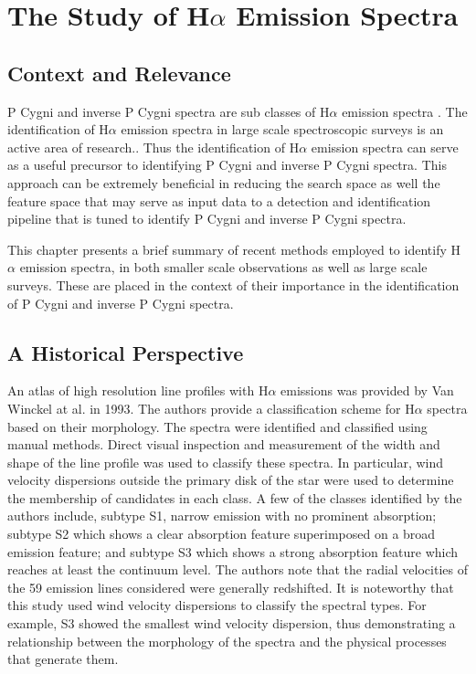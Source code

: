 \chapter{The Study of H$\alpha$ Emission Spectra}

\section{Context and Relevance}
P Cygni and inverse P Cygni spectra are sub classes of H$\alpha$ emission spectra \cite{zhang2021catalog}. The identification of H$\alpha$ emission spectra in large scale spectroscopic surveys is an active area of research.\cite{zhang2021catalog,vcotar2021galah,traven2015gaia}. Thus the identification of H$\alpha$ emission spectra can serve as a useful precursor to identifying P Cygni and inverse P Cygni spectra. This approach can be extremely beneficial in reducing the search space as well the feature space that may serve as input data to a detection and identification pipeline that is tuned to identify P Cygni and inverse P Cygni spectra. 

This chapter presents a brief summary of recent methods employed to identify H$\alpha$ emission spectra, in both smaller scale observations as well as large scale surveys. These are placed in the context of their importance in the identification of P Cygni and inverse P Cygni spectra.

\section{A Historical Perspective}
An atlas of high resolution line profiles with H$\alpha$ emissions was provided by Van Winckel at al. in 1993\cite{van1993atlas}. The authors provide a classification scheme for H$\alpha$ spectra based on their morphology. The spectra were identified and classified using manual methods. Direct visual inspection and measurement of the width and shape of the line profile was used to classify these spectra. In particular, wind velocity dispersions outside the primary disk of the star were used to determine the membership of candidates in each class.
A few of the classes identified by the authors include, subtype S1, narrow emission with no prominent absorption; subtype S2 which shows a clear absorption feature superimposed on a broad emission feature; and subtype S3 which shows a strong absorption feature which reaches at least the continuum level. The authors note that the radial velocities of the 59 emission lines considered were generally redshifted. It is noteworthy that this study used wind velocity dispersions to classify the spectral types. For example, S3 showed the smallest wind velocity dispersion, thus demonstrating a relationship between the morphology of the spectra and the physical processes that generate them.


